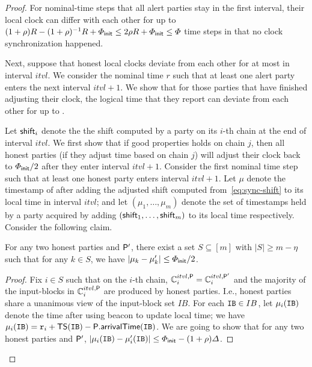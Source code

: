 \begin{proof}
    For nominal-time steps that all alert parties stay in the first interval, their local clock can differ with each other for up to $(1 + \rho) R - (1 + \rho)^{-1} R + \varPhi_{\mathsf{init}} \le 2 \rho R + \varPhi_{\mathsf{init}} \le \varPhi$ time steps in that no clock synchronization happened.

    Next, suppose that honest local clocks deviate from each other for at most \maxSkew in interval $itvl$.
    We consider the nominal time $r$ such that at least one alert party enters the next interval $itvl + 1$.
    We show that for those parties that have finished adjusting their clock, the logical time that they report can deviate from each other for up to \maxSkew.

    Let $\mathsf{shift}_i$ denote the the shift computed by a party \party on its $i$-th chain at the end of interval $itvl$.
    We first show that if good properties holds on chain $j$, then all honest parties (if they adjust time based on chain $j$) will adjust their clock back to $\varPhi_{\mathsf{init}} / 2$ after they enter interval $itvl + 1$.
    Consider the first nominal time step such that at least one honest party enters interval $itvl + 1$.
    Let $\mu$ denote the timestamp of \party after adding the adjusted shift computed from~\cref{eq:sync-shift} to its local time in interval $itvl$; and let $(\mu_1, \ldots, \mu_m)$ denote the set of timestamps held by a party \party acquired by adding $(\mathsf{shift}_1, \ldots, \mathsf{shift}_m)$ to its local time respectively.
    Consider the following claim.

    \begin{claim}
        For any two honest parties \party and $\mathsf{P}'$, there exist a set $S \subseteq [m]$ with $|S| \ge m - \eta$ such that for any $k \in S$, we have $|\mu_k - \mu'_k | \le \varPhi_{\mathsf{init}} / 2$.
    \end{claim}

    \begin{proof}
        Fix $i \in S$ such that on the $i$-th chain,  $\mathbb{C}^{itvl, \mathsf{P}}_i = \mathbb{C}^{itvl, \mathsf{P}'}_i$ and the majority of the input-blocks in $\mathbb{C}^{itvl, \mathsf{P}}_i$ are produced by honest parties.
        I.e., honest parties share a unanimous view of the input-block set $IB$.
        For each $\mathtt{IB} \in IB$, let $\mu_i(\mathtt{IB})$ denote the time after using beacon  to update local time; we have $\mu_i(\mathtt{IB}) = \mathtt{r}_i + \mathsf{TS}(\mathtt{IB}) - \mathsf{P}.\mathsf{arrivalTime}(\mathtt{IB})$.
        We are going to show that for any two honest parties \party and $\mathsf{P}'$, $|\mu_i(\mathtt{IB}) - \mu'_i(\mathtt{IB})| \le \varPhi_{\mathsf{init}} - (1 + \rho) \varDelta$.


\end{proof}
\end{proof}

